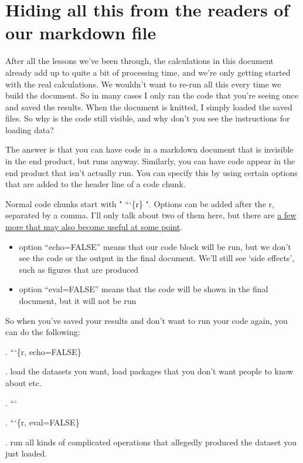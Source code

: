 \documentclass[
]{book}
\providecommand{\tightlist}{%
  \setlength{\itemsep}{0pt}\setlength{\parskip}{0pt}}
\begin{document}
\hypertarget{hiding-all-this-from-the-readers-of-our-markdown-file}{%
\section{Hiding all this from the readers of our markdown file}\label{hiding-all-this-from-the-readers-of-our-markdown-file}}

After all the lessons we've been through, the calculations in this document already add up to quite a bit of processing time, and we're only getting started with the real calculations. We wouldn't want to re-run all this every time we build the document. So in many cases I only ran the code that you're seeing once and saved the results. When the document is knitted, I simply loaded the saved files. So why is the code still visible, and why don't you see the instructions for loading data?

The answer is that you can have code in a markdown document that is invisible in the end product, but runs anyway. Similarly, you can have code appear in the end product that isn't actually run. You can specify this by using certain options that are added to the header line of a code chunk.

Normal code chunks start with " ```\{r\} ". Options can be added after the r, separated by a comma. I'll only talk about two of them here, but there are \href{https://rmarkdown.rstudio.com/lesson-3.html}{a few more that may also become useful at some point}.

\begin{itemize}
\tightlist
\item
  option ``echo=FALSE'' means that our code block will be run, but we don't see the code or the output in the final document. We'll still see `side effects', such as figures that are produced
\item
  option ``eval=FALSE'' means that the code will be shown in the final document, but it will not be run
\end{itemize}

So when you've saved your results and don't want to run your code again, you can do the following:

. ```\{r, echo=FALSE\}

. load the datasets you want, load packages that you don't want people to know about etc.

. ```

. ```\{r, eval=FALSE\}

. run all kinds of complicated operations that allegedly produced the dataset you just loaded.
\end{document}
